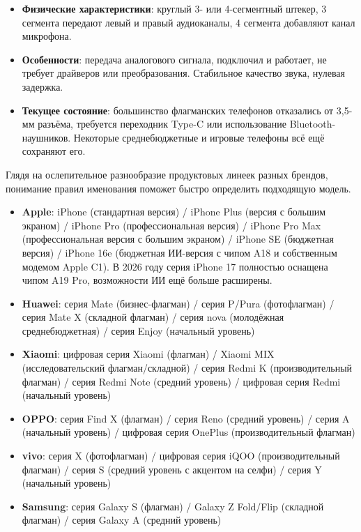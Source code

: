 
\begin{itemize}
  \item \textbf{Физические характеристики}: круглый 3- или 4-сегментный штекер, 3 сегмента передают левый и правый аудиоканалы, 4 сегмента добавляют канал микрофона.
  \item \textbf{Особенности}: передача аналогового сигнала, подключил и работает, не требует драйверов или преобразования. Стабильное качество звука, нулевая задержка.
  \item \textbf{Текущее состояние}: большинство флагманских телефонов отказались от 3,5-мм разъёма, требуется переходник Type-C или использование Bluetooth-наушников. Некоторые среднебюджетные и игровые телефоны всё ещё сохраняют его.
\end{itemize}


Глядя на ослепительное разнообразие продуктовых линеек разных брендов, понимание правил именования поможет быстро определить подходящую модель.


\begin{itemize}
  \item \textbf{Apple}: iPhone (стандартная версия) / iPhone Plus (версия с большим экраном) / iPhone Pro (профессиональная версия) / iPhone Pro Max (профессиональная версия с большим экраном) / iPhone SE (бюджетная версия) / iPhone 16e (бюджетная ИИ-версия с чипом A18 и собственным модемом Apple C1). В 2026 году серия iPhone 17 полностью оснащена чипом A19 Pro, возможности ИИ ещё больше расширены.
  \item \textbf{Huawei}: серия Mate (бизнес-флагман) / серия P/Pura (фотофлагман) / серия Mate X (складной флагман) / серия nova (молодёжная среднебюджетная) / серия Enjoy (начальный уровень)
  \item \textbf{Xiaomi}: цифровая серия Xiaomi (флагман) / Xiaomi MIX (исследовательский флагман/складной) / серия Redmi K (производительный флагман) / серия Redmi Note (средний уровень) / цифровая серия Redmi (начальный уровень)
  \item \textbf{OPPO}: серия Find X (флагман) / серия Reno (средний уровень) / серия A (начальный уровень) / цифровая серия OnePlus (производительный флагман)
  \item \textbf{vivo}: серия X (фотофлагман) / цифровая серия iQOO (производительный флагман) / серия S (средний уровень с акцентом на селфи) / серия Y (начальный уровень)
  \item \textbf{Samsung}: серия Galaxy S (флагман) / Galaxy Z Fold/Flip (складной флагман) / серия Galaxy A (средний уровень)
\end{itemize}

